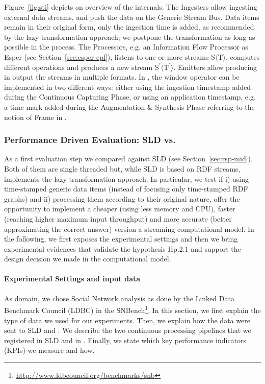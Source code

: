 Figure~\ref{fig:sti} depicts on overview of the \sti{} internals.
The Ingesters allow ingesting external data streams, and push the data on the Generic Stream Bus. Data items remain in their original form, only the ingestion time is added, as recommended by the lazy transformation approach; we postpone the transformation as long as possible in the process. 
The Processors, e.g. an Information Flow Processor as Esper (see Section~\ref{sec:esper-epl}), listens to one or more streams S$\langle\mathrm{T}\rangle$, computes different operations and produces a new stream S$^{\prime}\langle\mathrm{T^{\prime}}\rangle$. 
Emitters allow \sti{} producing in output the streams in multiple formats. 
In \sti{}, the window operator can be implemented in two different ways: either using the ingestion timestamp added during the Continuous Capturing Phase, or using an application timestamp, e.g. a time mark added during the Augmentation \& Synthesis Phase referring to the notion of Frame in \frappe{}.

\subsubsection{Performance Driven Evaluation: SLD vs. \sti{}} \label{sec:comp-mod-eval-performace}

As a first evaluation step we compared \sti{} against SLD (see Section~\ref{sec:rsp-mid}). Both of them are single threaded but, while SLD is based on RDF streams, \sti{} implements the lazy transformation approach.
In particular, we test if i) using time-stamped generic data items (instead of focusing only time-stamped RDF graphs) and ii) processing them according to their original nature, offer the opportunity to implement a cheaper (using less memory and CPU), faster (reaching higher maximum input throughput) and more accurate (better approximating the correct answer) version a streaming computational model. 
In the following, we first exposes the experimental settings and then we bring experimental evidences that validate the hypothesis \textsf{Hp.2.1} and support the design decision we made in the computational model.

\paragraph{Experimental Settings and input data}
As domain, we chose Social Network analysis as done by the Linked Data Benchmark Council (LDBC) in the SNBench\footnote{\url{http://www.ldbcouncil.org/benchmarks/snb}}. In this section, we first explain the type of data we used for our experiments. Then, we explain how the data were sent to SLD and \sti{}. We describe the two continuous processing pipelines that we registered in SLD and in \sti{}. Finally, we state which key performance indicators (KPIs) we measure and how.

